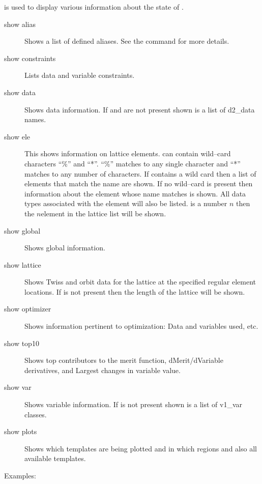 \vskip 0.2in
 is used to display various information about the state of \tao.
\begin{description}
\item[show alias]
Shows a list of defined aliases. See the  command for more
details.
\item[show constraints]
Lists data and variable constraints.
\item[show data]
Shows data information. If  and  are not
present shown is a list of d2\_data names.
\item[show ele]
This shows information on lattice elements.  can
contain wild--card characters ``\%'' and ``*''. ``\%'' matches to any
single character and ``*'' matches to any number of characters. If
 contains a wild card then a list of elements that
match the name are shown. If no wild--card is present then information
about the element whose name matches  is
shown. All data types associated with the element will also be listed.
  is a number $n$ then the $n$\Th element in the
lattice list will be shown.
\item[show global]
Shows global information.
\item[show lattice]
Shows Twiss and orbit data for the  lattice
at the specified regular element locations. If  is not present
then the length of the lattice will be shown.
\item[show optimizer]
Shows information pertinent to optimization: Data and variables used, etc.
\item[show top10]
Shows top contributors to the merit function, dMerit/dVariable
derivatives, and Largest changes in variable value.
\item[show var]
Shows variable information. If   is
not present shown is a list of v1\_var classes.
\item[show plots]
Shows which templates are being plotted and in which regions and also all
available templates.
\end{description}

Examples:

